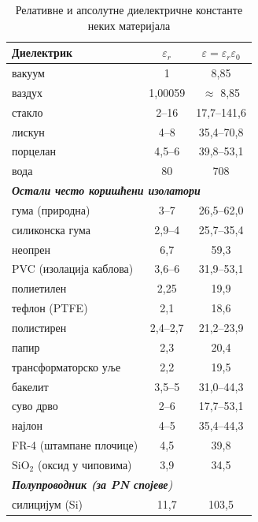 \documentclass{article}
\begin{document}
\begin{table}[H]
    \centering
    \begin{tabular}{|l|c|c|}
        \hline
        \textbf{Диелектрик} & $\varepsilon_r$ & $\varepsilon = \varepsilon_r \varepsilon_0$ \; [$10^{-12}$ F/m] \\
        \hline
        вакуум & 1 & 8,85 \\
        ваздух & 1,00059 & $\approx$ 8,85 \\
        стакло & 2--16 & 17,7--141,6 \\
        лискун & 4--8 & 35,4--70,8 \\
        порцелан & 4,5--6 & 39,8--53,1 \\
        вода & 80 & 708 \\
        \hline
        \multicolumn{3}{|l|}{\textit{\textbf{Остали често коришћени изолатори}}} \\
        \hline
        гума (природна) & 3--7 & 26,5--62,0 \\
        силиконска гума & 2,9--4 & 25,7--35,4 \\
        неопрен & 6,7 & 59,3 \\
        PVC (изолација каблова) & 3,6--6 & 31,9--53,1 \\
        полиетилен & 2,25 & 19,9 \\
        тефлон (PTFE) & 2,1 & 18,6 \\
        полистирен & 2,4--2,7 & 21,2--23,9 \\
        папир & 2,3 & 20,4 \\
        трансформаторско уље & 2,2 & 19,5 \\
        бакелит & 3,5--5 & 31,0--44,3 \\
        суво дрво & 2--6 & 17,7--53,1 \\
        најлон & 4--5 & 35,4--44,3 \\
        FR-4 (штампане плочице) & 4,5 & 39,8 \\
        $\mathrm{SiO_2}$ (оксид у чиповима) & 3,9 & 34,5 \\
        \hline
        \multicolumn{3}{|l|}{\textit{\textbf{Полупроводник (за PN спојеве})}} \\
        \hline
        силицијум (Si) & 11,7 & 103,5 \\
        \hline
    \end{tabular}
    \caption{Релативне и апсолутне диелектричне константе неких материјала}
    \label{tab:dielektrici}
\end{table}
\end{document}
